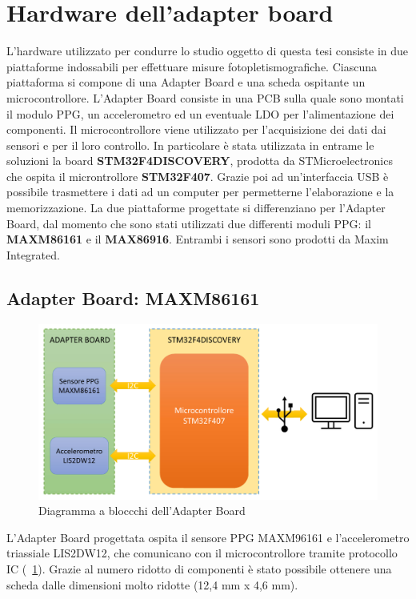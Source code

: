 \section{Hardware dell'adapter board}
L'hardware utilizzato per condurre lo studio oggetto di questa tesi consiste in due piattaforme indossabili per effettuare misure fotopletismografiche. Ciascuna piattaforma si compone di una Adapter Board e una scheda ospitante un microcontrollore. L'Adapter Board consiste in una PCB sulla quale sono montati il modulo PPG, un accelerometro ed un eventuale LDO per l'alimentazione dei componenti. Il microcontrollore viene utilizzato per l'acquisizione dei dati dai sensori e per il loro controllo. In particolare è stata utilizzata in entrame le soluzioni la board \textbf{STM32F4DISCOVERY}, prodotta da STMicroelectronics che ospita il microntrollore \textbf{STM32F407}. Grazie poi ad un'interfaccia USB è possibile trasmettere i dati ad un computer per permetterne l'elaborazione e la memorizzazione.
La due piattaforme progettate si differenziano per l'Adapter Board, dal momento che sono stati utilizzati due differenti moduli PPG: il \textbf{MAXM86161} e il \textbf{MAX86916}. Entrambi i sensori sono prodotti da Maxim Integrated.
\subsection{Adapter Board: MAXM86161}
\begin{figure}[b]
	\centering
	\includegraphics[width=0.6\linewidth]{ImageFiles/Hardware/DiagrammaBlocchiMAXM86161}
	\caption{Diagramma a bloccchi dell'Adapter Board}
	\label{fig:DiagrammaBlocchiMAXM86161}
\end{figure}
L'Adapter Board progettata ospita il sensore PPG MAXM96161 e l'accelerometro triassiale LIS2DW12, che comunicano con il microcontrollore tramite protocollo IC (\Fig~\ref{fig:DiagrammaBlocchiMAXM86161}). Grazie al numero ridotto di componenti è stato possibile ottenere una scheda dalle dimensioni molto ridotte (12,4 mm x 4,6 mm).

